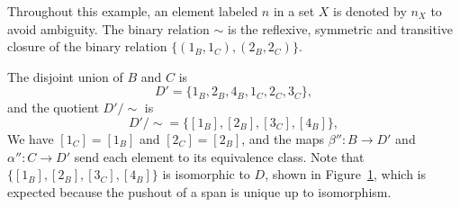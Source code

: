 \begin{example}
\begin{figure}[H]
{
      }
      \caption{}
      \label{fig:preliminaries:a_rewriting_step_dfjalsdkjflg}
  \end{figure}
    Throughout this example, an element labeled \(n\) in a set \(X\) is denoted by \(n_X\) to avoid ambiguity.        
    The binary relation \(\sim\) is the reflexive, symmetric and transitive closure of the binary relation $\{(1_B,1_C),(2_B,2_C)\}$.
 
    The disjoint union of \(B\) and \(C\) is
    \[ 
    D' = \{1_B,2_B,4_B,1_C,2_C,3_C\},
    \]
    and the quotient \(D'/\sim\) is
    \[
    D'/\sim = \{[1_B],[2_B],[3_C],[4_B]\},
    \]
    We have \([1_C]=[1_B]\) and \([2_C]=[2_B]\), and the maps
    \(\beta'' \colon B\to D'\) and \(\alpha'' \colon C\to D'\) send each element to its equivalence class. Note that \(\{[1_B],[2_B],[3_C],[4_B]\}\) is isomorphic to \(D\), shown in Figure~\ref{fig:preliminaries:a_rewriting_step_dfjalsdkjflg}, which is expected because the pushout of a span is unique up to isomorphism.
\end{example}

